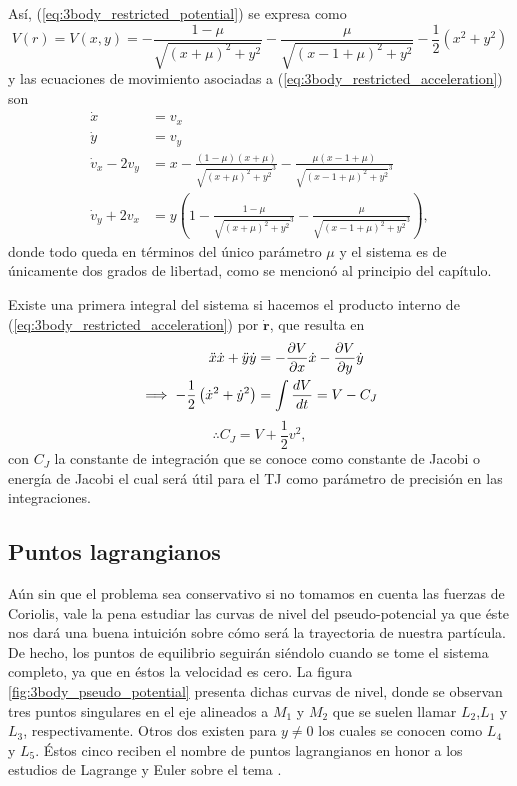 Así, (\ref{eq:3body_restricted_potential}) se expresa como
\begin{equation}
 V(r) = V(x,y) = -\frac{1 - \mu}{\sqrt{(x + \mu)^2 + y^2}} -  \frac{\mu}{\sqrt{(x - 1 + \mu)^2 + y^2}} - \frac{1}{2} \left(x^2 + y^2 \right)
\end{equation}
y las ecuaciones de movimiento asociadas a (\ref{eq:3body_restricted_acceleration}) son
\begin{align}
 \dot{x} &= v_x \\
 \dot{y} &= v_y \\
 \dot{v}_x - 2v_y &=  x - \frac{(1 - \mu) (x+\mu)}{\sqrt{ (x+\mu)^2 + y^2 }^3} - \frac{\mu (x - 1 + \mu) }{\sqrt{(x - 1 +  \mu)^2 + y^2}^3 } \\ 
 \dot{v}_y + 2v_x &= y \left( 1 - \frac{ 1 - \mu }{\sqrt{(x+\mu)^2 + y^2}^3} - \frac{\mu}{\sqrt{(x - 1 + \mu)^2 + y^2}^3} \right),
 \label{eq:3body_restricted_ eqs_motion}
\end{align}
donde todo queda en términos del único parámetro $\mu$ y el sistema es de únicamente dos grados de libertad, como se mencionó al principio del capítulo. 

Existe una primera integral del sistema si hacemos el producto interno de (\ref{eq:3body_restricted_acceleration}) por $\dot{\mathbf{r}}$, que resulta en 
\begin{align*}
 \ddot{x} \dot{x} + \ddot{y} \dot{y} &= - \frac{\partial V}{\partial x}\dot{x} - \frac{\partial V}{\partial y} \dot{y} \\
 \implies - \frac{1}{2} \left( \dot{x}^2 + \dot{y}^2 \right) &= \int \frac{d V}{dt} = V - C_J 
\end{align*}
\begin{equation}
 \therefore C_J = V + \frac{1}{2}v^2,
 \label{eq:3body_jacobi_constant}
\end{equation}
con $C_J$ la constante de integración que se conoce como constante de Jacobi o energía de Jacobi el cual será útil para el TJ como parámetro de precisión en las integraciones.

\subsection{Puntos lagrangianos}
\label{sec:lag_points}

Aún sin que el problema sea conservativo si no tomamos en cuenta las fuerzas de Coriolis, vale la pena estudiar las curvas de nivel del pseudo-potencial ya que éste nos dará una buena intuición sobre cómo será la trayectoria de nuestra partícula. De hecho, los puntos de equilibrio seguirán siéndolo cuando se tome el sistema completo, ya que en éstos la velocidad es cero. La figura \ref{fig:3body_pseudo_potential} presenta dichas curvas de nivel, donde se observan tres puntos singulares en el eje alineados a $M_1$ y $M_2$ que se suelen llamar $L_2$,$L_1$ y $L_3$, respectivamente. Otros dos existen para $y \neq 0$ los cuales se conocen como $L_4$ y $L_5$. Éstos cinco reciben el nombre de puntos lagrangianos en honor a los estudios de Lagrange y Euler sobre el tema \cite{Lagrange1867 , Euler1736}.

